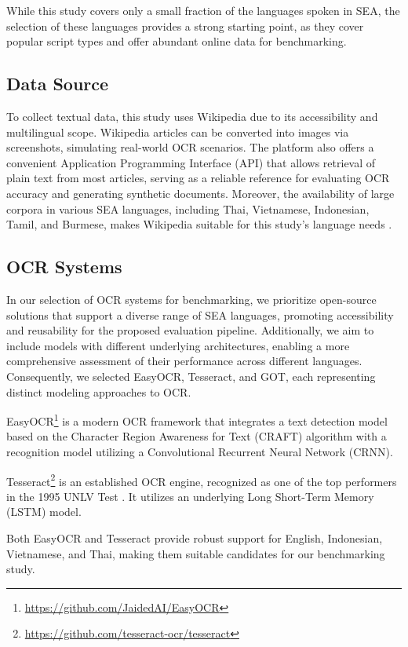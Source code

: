 \documentclass[12pt,oneside]{memoir}
\begin{document}
While this study covers only a small fraction of the languages spoken in SEA, the selection of these languages provides a strong starting point, as they cover popular script types and offer abundant online data for benchmarking.

\subsection{Data Source}

To collect textual data, this study uses Wikipedia due to its accessibility and multilingual scope.
Wikipedia articles can be converted into images via screenshots, simulating real-world OCR scenarios. 
The platform also offers a convenient Application Programming Interface (API) that allows retrieval of plain text from most articles, serving as a reliable reference for evaluating OCR accuracy and generating synthetic documents.
Moreover, the availability of large corpora in various SEA languages, including Thai, Vietnamese, Indonesian, Tamil, and Burmese, makes Wikipedia suitable for this study's language needs \parencite{list-of-wikipedias-2024}. 

\subsection{OCR Systems}

In our selection of OCR systems for benchmarking, we prioritize open-source 
solutions that support a diverse range of SEA languages, promoting accessibility and reusability for the proposed evaluation pipeline. 
Additionally, we aim to include models with different underlying architectures, enabling a more comprehensive assessment of their performance across different languages.
Consequently, we selected EasyOCR, Tesseract, and GOT, each representing distinct modeling approaches to OCR.

EasyOCR\footnote{\url{https://github.com/JaidedAI/EasyOCR}} is a modern OCR framework that integrates a text detection model 
based on the Character Region Awareness for Text (CRAFT) algorithm with a 
recognition model utilizing a Convolutional Recurrent Neural Network (CRNN).

Tesseract\footnote{\url{https://github.com/tesseract-ocr/tesseract}} is an established OCR engine, recognized as one of the top performers in the 1995 UNLV Test \parencite{rice-etal-1995}. It utilizes an underlying Long Short-Term Memory (LSTM) model. 

Both EasyOCR and Tesseract provide robust support for English, Indonesian, Vietnamese, and Thai, making them suitable candidates for our benchmarking study.
\end{document}
